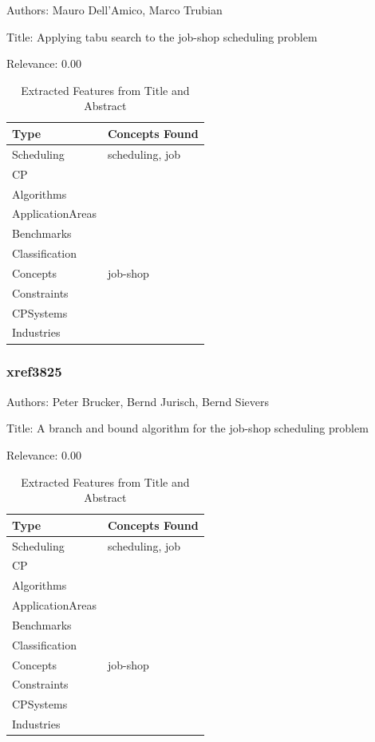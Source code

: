 Authors: Mauro Dell'Amico, Marco Trubian

Title: Applying tabu search to the job-shop scheduling problem

Relevance:  0.00

{\scriptsize
\begin{longtable}{p{2cm}p{20cm}}
\caption{Extracted Features from Title and Abstract}\\ \toprule
Type & Concepts Found\\ \midrule
\endhead
\bottomrule
\endfoot
Scheduling & scheduling, job\\ 
CP & \\ 
Algorithms & \\ 
ApplicationAreas & \\ 
Benchmarks & \\ 
Classification & \\ 
Concepts & job-shop\\ 
Constraints & \\ 
CPSystems & \\ 
Industries & \\ 
\end{longtable}
}



\subsubsection{xref3825}
\label{mw:xref3825}

Authors: Peter Brucker, Bernd Jurisch, Bernd Sievers

Title: A branch and bound algorithm for the job-shop scheduling problem

Relevance:  0.00

{\scriptsize
\begin{longtable}{p{2cm}p{20cm}}
\caption{Extracted Features from Title and Abstract}\\ \toprule
Type & Concepts Found\\ \midrule
\endhead
\bottomrule
\endfoot
Scheduling & scheduling, job\\ 
CP & \\ 
Algorithms & \\ 
ApplicationAreas & \\ 
Benchmarks & \\ 
Classification & \\ 
Concepts & job-shop\\ 
Constraints & \\ 
CPSystems & \\ 
Industries & \\ 
\end{longtable}
}



